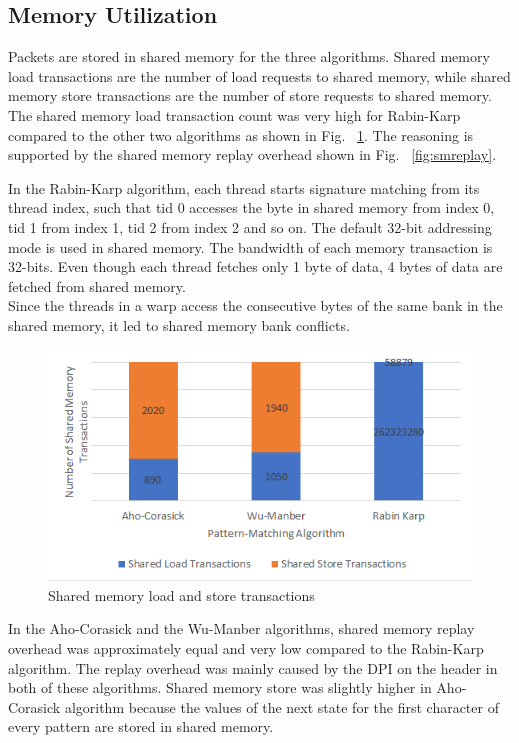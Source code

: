 \subsection{Memory Utilization}

Packets are stored in shared memory for the three algorithms. Shared memory load transactions are the number of load requests to shared memory, while shared memory store transactions are the number of store requests to shared memory. The shared memory load transaction count was very high for Rabin-Karp compared to the other two algorithms as shown in Fig. ~\ref{fig:smload}. The reasoning is supported by the shared memory replay overhead shown in Fig. ~\ref{fig:smreplay}.

In the Rabin-Karp algorithm, each thread starts signature matching from its thread index, such that tid 0 accesses the byte in shared memory from index 0, tid 1 from index 1, tid 2 from index 2 and so on. The default 32-bit addressing mode is used in shared memory. The bandwidth of each memory transaction is 32-bits. Even though each thread fetches only 1 byte of data, 4 bytes of data are fetched from shared memory. \\Since the threads in a warp access the consecutive bytes of the same bank in the shared memory, it led to shared memory bank conflicts.

\begin{figure}[H]
	\centering
	\includegraphics[width=12cm]{smtransactions.png}
	\caption{Shared memory load and store transactions}
	\label{fig:smload}    
\end{figure}
\squeezeup

In the Aho-Corasick and the Wu-Manber algorithms, shared memory replay overhead was approximately equal and very low compared to the Rabin-Karp algorithm. The replay overhead was mainly caused by the DPI on the header in both of these algorithms. Shared memory store was slightly higher in Aho-Corasick algorithm because the values of the next state for the first character of every pattern are stored in shared memory. 

